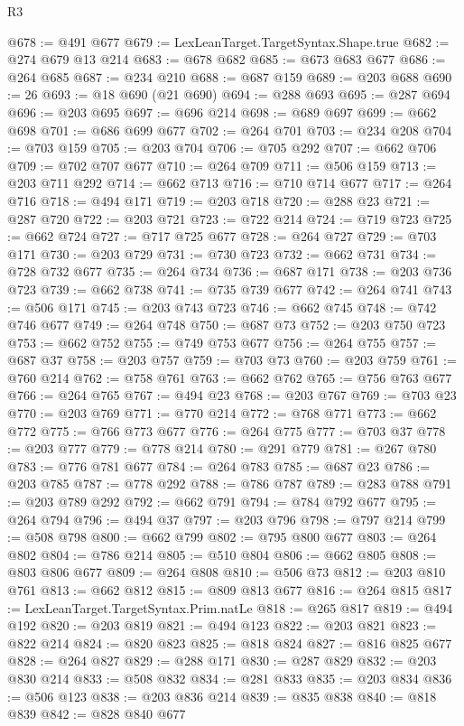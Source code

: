 \begin{lexlean}{R3}
\begin{coremodule}
@678 := @491 @677
@679 := LexLeanTarget.TargetSyntax.Shape.true
@682 := @274 @679 @13 @214
@683 := @678 @682
@685 := @673 @683 @677
@686 := @264 @685
@687 := @234 @210
@688 := @687 @159
@689 := @203 @688
@690 := 26
@693 := @18 @690 (@21 @690)
@694 := @288 @693
@695 := @287 @694
@696 := @203 @695
@697 := @696 @214
@698 := @689 @697
@699 := @662 @698
@701 := @686 @699 @677
@702 := @264 @701
@703 := @234 @208
@704 := @703 @159
@705 := @203 @704
@706 := @705 @292
@707 := @662 @706
@709 := @702 @707 @677
@710 := @264 @709
@711 := @506 @159
@713 := @203 @711 @292
@714 := @662 @713
@716 := @710 @714 @677
@717 := @264 @716
@718 := @494 @171
@719 := @203 @718
@720 := @288 @23
@721 := @287 @720
@722 := @203 @721
@723 := @722 @214
@724 := @719 @723
@725 := @662 @724
@727 := @717 @725 @677
@728 := @264 @727
@729 := @703 @171
@730 := @203 @729
@731 := @730 @723
@732 := @662 @731
@734 := @728 @732 @677
@735 := @264 @734
@736 := @687 @171
@738 := @203 @736 @723
@739 := @662 @738
@741 := @735 @739 @677
@742 := @264 @741
@743 := @506 @171
@745 := @203 @743 @723
@746 := @662 @745
@748 := @742 @746 @677
@749 := @264 @748
@750 := @687 @73
@752 := @203 @750 @723
@753 := @662 @752
@755 := @749 @753 @677
@756 := @264 @755
@757 := @687 @37
@758 := @203 @757
@759 := @703 @73
@760 := @203 @759
@761 := @760 @214
@762 := @758 @761
@763 := @662 @762
@765 := @756 @763 @677
@766 := @264 @765
@767 := @494 @23
@768 := @203 @767
@769 := @703 @23
@770 := @203 @769
@771 := @770 @214
@772 := @768 @771
@773 := @662 @772
@775 := @766 @773 @677
@776 := @264 @775
@777 := @703 @37
@778 := @203 @777
@779 := @778 @214
@780 := @291 @779
@781 := @267 @780
@783 := @776 @781 @677
@784 := @264 @783
@785 := @687 @23
@786 := @203 @785
@787 := @778 @292
@788 := @786 @787
@789 := @283 @788
@791 := @203 @789 @292
@792 := @662 @791
@794 := @784 @792 @677
@795 := @264 @794
@796 := @494 @37
@797 := @203 @796
@798 := @797 @214
@799 := @508 @798
@800 := @662 @799
@802 := @795 @800 @677
@803 := @264 @802
@804 := @786 @214
@805 := @510 @804
@806 := @662 @805
@808 := @803 @806 @677
@809 := @264 @808
@810 := @506 @73
@812 := @203 @810 @761
@813 := @662 @812
@815 := @809 @813 @677
@816 := @264 @815
@817 := LexLeanTarget.TargetSyntax.Prim.natLe
@818 := @265 @817
@819 := @494 @192
@820 := @203 @819
@821 := @494 @123
@822 := @203 @821
@823 := @822 @214
@824 := @820 @823
@825 := @818 @824
@827 := @816 @825 @677
@828 := @264 @827
@829 := @288 @171
@830 := @287 @829
@832 := @203 @830 @214
@833 := @508 @832
@834 := @281 @833
@835 := @203 @834
@836 := @506 @123
@838 := @203 @836 @214
@839 := @835 @838
@840 := @818 @839
@842 := @828 @840 @677

\end{coremodule}
\end{lexlean}
